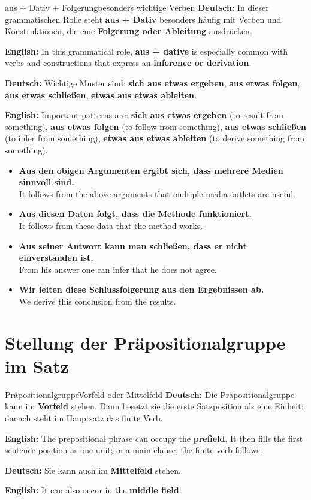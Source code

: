 \documentclass[a4paper,11pt]{article}
\newcommand{\GermanText}[1]{\textbf{Deutsch: }#1\par}
\newcommand{\EnglishText}[1]{{\small\color{SoftGray}\textbf{English: }#1\par}}
\newcommand{\ExampleItem}[2]{\item \textbf{#1}\\{\small\color{SoftGray}#2}}
\begin{document}
\begin{grammarentry}{aus + Dativ + Folgerung}{besonders wichtige Verben}
\GermanText{In dieser grammatischen Rolle steht \textbf{aus + Dativ} besonders häufig mit Verben und Konstruktionen, die eine \textbf{Folgerung oder Ableitung} ausdrücken.}
\EnglishText{In this grammatical role, \textbf{aus + dative} is especially common with verbs and constructions that express an \textbf{inference or derivation}.}

\GermanText{Wichtige Muster sind: \textbf{sich aus etwas ergeben}, \textbf{aus etwas folgen}, \textbf{aus etwas schließen}, \textbf{etwas aus etwas ableiten}.}
\EnglishText{Important patterns are: \textbf{sich aus etwas ergeben} (to result from something), \textbf{aus etwas folgen} (to follow from something), \textbf{aus etwas schließen} (to infer from something), \textbf{etwas aus etwas ableiten} (to derive something from something).}
\end{grammarentry}

\begin{exbox}
\begin{itemize}
\ExampleItem{Aus den obigen Argumenten ergibt sich, dass mehrere Medien sinnvoll sind.}{It follows from the above arguments that multiple media outlets are useful.}
\ExampleItem{Aus diesen Daten folgt, dass die Methode funktioniert.}{It follows from these data that the method works.}
\ExampleItem{Aus seiner Antwort kann man schließen, dass er nicht einverstanden ist.}{From his answer one can infer that he does not agree.}
\ExampleItem{Wir leiten diese Schlussfolgerung aus den Ergebnissen ab.}{We derive this conclusion from the results.}
\end{itemize}
\end{exbox}

\section{Stellung der Präpositionalgruppe im Satz}

\begin{grammarentry}{Präpositionalgruppe}{Vorfeld oder Mittelfeld}
\GermanText{Die Präpositionalgruppe kann im \textbf{Vorfeld} stehen. Dann besetzt sie die erste Satzposition als eine Einheit; danach steht im Hauptsatz das finite Verb.}
\EnglishText{The prepositional phrase can occupy the \textbf{prefield}. It then fills the first sentence position as one unit; in a main clause, the finite verb follows.}

\GermanText{Sie kann auch im \textbf{Mittelfeld} stehen.}
\EnglishText{It can also occur in the \textbf{middle field}.}
\end{grammarentry}
\end{document}
